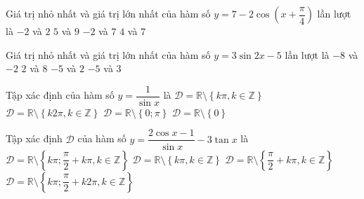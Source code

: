 \begin{ex}%
	Giá trị nhỏ nhất và giá trị lớn nhất của hàm số  $y=7-2\cos\left(x+\dfrac{\pi}{4}\right)$ lần lượt là
	 \choice
		 {$-2$ và $2$}
		{\True $5$  và $9$}
		 {$-2$ và $7$}
		{$4$ và $7$} 
\end{ex}

\begin{ex}%
	Giá trị nhỏ nhất  và giá trị lớn nhất của hàm số $y=3\sin 2x-5$ lần lượt là
	 \choice
		{\True $-8$  và $-2$}
		{$2$ và $8$} 
		{$-5$ và $2$} 
		{$-5$ và  $3$}
\end{ex}

\begin{ex}%
	Tập xác định của hàm số $y=\dfrac{1}{\sin x}$  là
	\choice 
		{\True  $\mathscr{D}=\mathbb{R}\setminus \left\{ k\pi ,k\in \mathbb{Z} \right\}$}
		 {$\mathscr{D}=\mathbb{R}\setminus \left\{ k2\pi ,k\in \mathbb{Z} \right\}$}
		{$\mathscr{D}=\mathbb{R}\setminus\left\{  0;\pi \right\}$}
		{$\mathscr{D}=\mathbb{R}\setminus\left\{ 0 \right\}$} 
\end{ex}

\begin{ex}%
	Tập xác định $\mathscr{D}$ của hàm số $y=\dfrac{2\cos x-1}{\sin x}-3\tan x$ là 
	 \choice
		{\True $\mathscr{D}=\mathbb{R}\setminus \left\{  k\pi;\dfrac{\pi }{2}+k\pi ,k\in \mathbb{Z} \right\}$}
		{$\mathscr{D}=\mathbb{R}\setminus \left\{ k\pi ,k\in  \mathbb{Z} \right\}$}
		{$\mathscr{D}=\mathbb{R}\setminus \left\{ \dfrac{\pi  }{2}+k\pi ,k\in \mathbb{Z} \right\}$}
		{$\mathscr{D}=\mathbb{R}\setminus \left\{ k\pi;\dfrac{\pi }{2}+k2\pi ,k\in  \mathbb{Z} \right\}$}
\end{ex}

